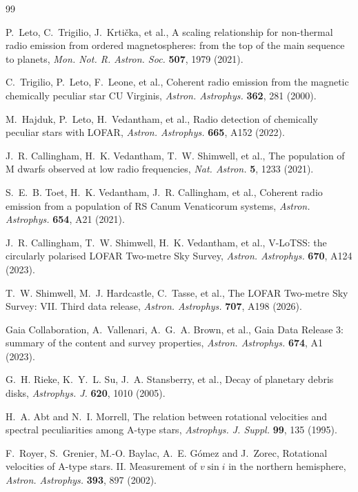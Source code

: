 \documentclass[3p,11pt]{elsarticle}
\begin{document}
\begin{thebibliography}{99}\small\raggedright
\setlength{\itemsep}{1pt}

P.~Leto, C.~Trigilio, J.~Krti\v{c}ka, et al., A scaling relationship for non-thermal radio
emission from ordered magnetospheres: from the top of the main sequence to planets,
\emph{Mon. Not. R. Astron. Soc.} \textbf{507}, 1979 (2021).

C.~Trigilio, P.~Leto, F.~Leone, et al., Coherent radio emission from the magnetic
chemically peculiar star CU Virginis, \emph{Astron. Astrophys.} \textbf{362}, 281 (2000).

M.~Hajduk, P.~Leto, H.~Vedantham, et al., Radio detection of chemically peculiar stars
with LOFAR, \emph{Astron. Astrophys.} \textbf{665}, A152 (2022).

J.~R. Callingham, H.~K. Vedantham, T.~W. Shimwell, et al., The population of M dwarfs
observed at low radio frequencies, \emph{Nat. Astron.} \textbf{5}, 1233 (2021).

S.~E.~B. Toet, H.~K. Vedantham, J.~R. Callingham, et al., Coherent radio emission from a
population of RS Canum Venaticorum systems, \emph{Astron. Astrophys.} \textbf{654}, A21
(2021).

J.~R. Callingham, T.~W. Shimwell, H.~K. Vedantham, et al., V-LoTSS: the circularly
polarised LOFAR Two-metre Sky Survey, \emph{Astron. Astrophys.} \textbf{670}, A124
(2023).

T.~W. Shimwell, M.~J. Hardcastle, C.~Tasse, et al., The LOFAR Two-metre Sky Survey: VII.
Third data release, \emph{Astron. Astrophys.} \textbf{707}, A198 (2026).

Gaia Collaboration, A.~Vallenari, A.~G.~A. Brown, et al., Gaia Data Release 3: summary
of the content and survey properties, \emph{Astron. Astrophys.} \textbf{674}, A1 (2023).

G.~H. Rieke, K.~Y.~L. Su, J.~A. Stansberry, et al., Decay of planetary debris disks,
\emph{Astrophys. J.} \textbf{620}, 1010 (2005).

H.~A. Abt and N.~I. Morrell, The relation between rotational velocities and spectral
peculiarities among A-type stars, \emph{Astrophys. J. Suppl.} \textbf{99}, 135 (1995).

F.~Royer, S.~Grenier, M.-O. Baylac, A.~E. G\'omez and J.~Zorec, Rotational velocities
of A-type stars. II. Measurement of $v\sin i$ in the northern hemisphere,
\emph{Astron. Astrophys.} \textbf{393}, 897 (2002).


\end{thebibliography}
\end{document}
